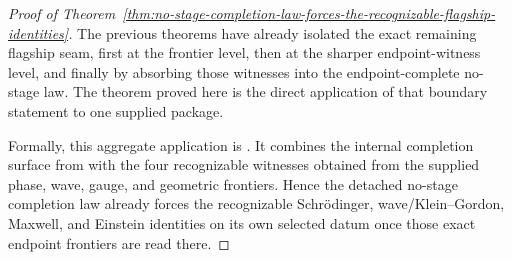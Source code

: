 \begin{proof}[Proof of Theorem~\ref{thm:no-stage-completion-law-forces-the-recognizable-flagship-identities}]
\label{proof:thm:no-stage-completion-law-forces-the-recognizable-flagship-identities}
The previous theorems have already isolated the exact remaining flagship seam,
first at the frontier level, then at the sharper endpoint-witness level, and
finally by absorbing those witnesses into the endpoint-complete no-stage law.
The theorem proved here is the direct
application of that boundary statement to one supplied
 package.

Formally, this aggregate application is
. It
combines the internal completion surface from
 with
the four recognizable witnesses obtained from the supplied phase, wave,
gauge, and geometric frontiers. Hence the detached no-stage completion law
already forces the recognizable Schr\"odinger, wave/Klein--Gordon, Maxwell,
and Einstein identities on its own selected datum once those exact endpoint
frontiers are read there.
\end{proof}

